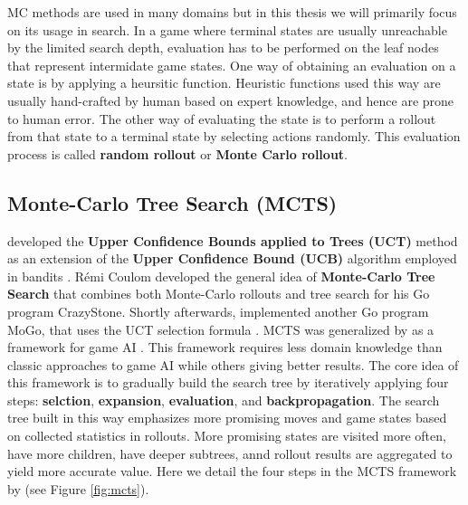 \documentclass[12pt]{article}
\begin{document}
MC methods are used in many domains but in this thesis we will primarily focus on its usage in search.
In a game where terminal states are usually unreachable by the limited search depth, evaluation has to be performed on the leaf nodes that represent intermidate game states.
One way of obtaining an evaluation on a state is by applying a heursitic function.
Heuristic functions used this way are usually hand-crafted by human based on expert knowledge, and hence are prone to human error.
The other way of evaluating the state is to perform a rollout from that state to a terminal state by selecting actions randomly.
This evaluation process is called \textbf{random rollout} or \textbf{Monte Carlo rollout}.

\subsection{Monte-Carlo Tree Search (MCTS)} \label{sec:mcts}

\citeauthor{BanditBasedMonteCarlo_Kocsis.Szepesvari_2006} developed the \textbf{Upper Confidence Bounds applied to Trees (UCT)} method as an extension of the \textbf{Upper Confidence Bound (UCB)} algorithm employed in bandits \cite{BanditBasedMonteCarlo_Kocsis.Szepesvari_2006}.
Rémi Coulom developed the general idea of \textbf{Monte-Carlo Tree Search} that combines both Monte-Carlo rollouts and tree search \cite{EfficientSelectivityBackup_Coulom_2007} for his Go program CrazyStone.
Shortly afterwards,
\citeauthor{ModificationUCTPatterns_Gelly.Wang.ea_2006} implemented another Go program MoGo, that uses the UCT selection formula \cite{ModificationUCTPatterns_Gelly.Wang.ea_2006}.
MCTS was generalized by \citeauthor{MonteCarloTreeSearch_Chaslot.Bakkes.ea_2008} as a framework for game AI \cite{MonteCarloTreeSearch_Chaslot.Bakkes.ea_2008}.
This framework requires less domain knowledge than classic approaches to game AI while others giving better results.
The core idea of this framework is to gradually build the search tree by iteratively applying four steps: \textbf{selction}, \textbf{expansion}, \textbf{evaluation}, and \textbf{backpropagation}.
The search tree built in this way emphasizes more promising moves and game states based on collected statistics in rollouts.
More promising states are visited more often, have more children, have deeper subtrees, annd rollout results are aggregated to yield more accurate value. Here we detail the four steps in the MCTS framework by \citeauthor{MonteCarloTreeSearch_Chaslot.Bakkes.ea_2008} (see Figure \ref{fig:mcts}).
\end{document}
